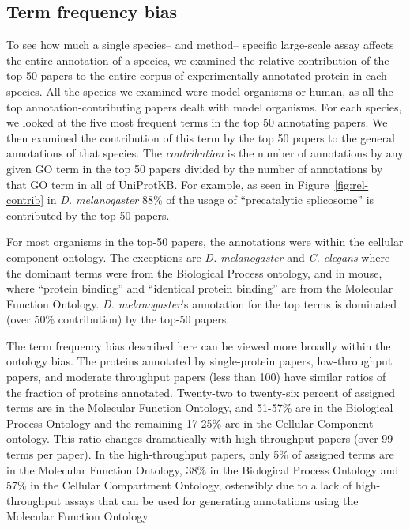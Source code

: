 \documentclass[12pt]{article}
\begin{document}
\subsection*{Term frequency bias}

To see how much a single species-- and method-- specific large-scale assay affects the entire
annotation of a species, we examined the relative contribution of the top-50 papers to the
entire corpus of experimentally annotated protein in each species.  All the species we
examined were model organisms or human, as all the top annotation-contributing papers dealt with model
organisms. For each species, we looked at the five most frequent terms in the top 50
annotating papers. We then examined the contribution of this term by the top 50 papers to the
general annotations of that species.  The \textit{contribution} is the number of annotations
by any given GO term in the top 50 papers divided by the number of annotations by that GO
term in all of UniProtKB.  For example, as seen in Figure~\ref{fig:rel-contrib} in \textit{D.
melanogaster} 88\% of the usage of ``precatalytic splicosome'' is contributed by the top-50
papers. 


For most organisms in the top-50 papers,  the annotations were within the cellular component
ontology. The exceptions are \textit{D. melanogaster} and \textit{C. elegans} where the
dominant terms were from the Biological Process ontology, and in mouse, where ``protein
binding'' and ``identical protein binding'' are from the Molecular Function Ontology.
\textit{D. melanogaster}'s annotation for the top terms is dominated (over 50\% contribution)
by the top-50 papers. 

The term frequency bias described here can be viewed more broadly within the ontology bias. The proteins
annotated by single-protein papers, low-throughput papers, and moderate throughput papers (less than 100)
have similar ratios of the fraction of proteins annotated.  Twenty-two to twenty-six percent of assigned
terms are in the Molecular Function Ontology, and 51-57\% are in the Biological Process Ontology and the
remaining 17-25\% are in the Cellular Component ontology. This ratio changes dramatically with
high-throughput papers (over 99 terms per paper). In the high-throughput papers, only 5\% of assigned
terms are in the Molecular Function Ontology, 38\% in the Biological Process Ontology and 57\% in the
Cellular Compartment Ontology, ostensibly due to a lack of high-throughput assays that can be used for
generating annotations using the Molecular Function Ontology. 
\end{document}

